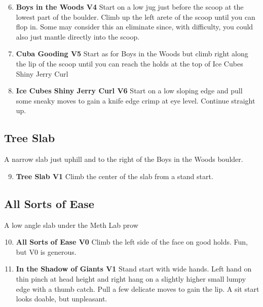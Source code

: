 \begin{enumerate}[]
	\setcounter{enumi}{5}
	\item\label{rt:Boys in the Woods} \colorbox{RoyalBlue!20}{\textbf{Boys in the Woods V4    } }
	\newline Start on a low jug just before the scoop at the lowest part of the boulder. Climb up the left arete of the scoop until you can flop in. Some may consider this an eliminate since, with difficulty, you could also just mantle directly into the scoop.\
	\setcounter{enumi}{6}
	\item\label{rt:Cuba Gooding} \colorbox{RoyalBlue!20}{\textbf{Cuba Gooding V5  } }
	\newline Start as for Boys in the Woods but climb right along the lip of the scoop until you can reach the holds at the top of Ice Cubes Shiny Jerry Curl\
	\setcounter{enumi}{7}
	\item\label{rt:Ice Cubes Shiny Jerry Curl} \colorbox{RoyalBlue!20}{\textbf{Ice Cubes Shiny Jerry Curl V6  } }
	\newline Start on a low sloping edge and pull some sneaky moves to gain a knife edge crimp at eye level. Continue straight up.\
\end{enumerate}
\subsection*{Tree Slab}\label{bf:Tree Slab}
A narrow slab just uphill and to the right of the Boys in the Woods boulder.

\begin{enumerate}[]
	\setcounter{enumi}{8}
	\item\label{rt:Tree Slab} \colorbox{green!20}{\textbf{Tree Slab V1    } }
	\newline Climb the center of the slab from a stand start.\
\end{enumerate}
\subsection*{All Sorts of Ease}\label{bf:All Sorts of Ease}
A low angle slab under the Meth Lab prow

\begin{enumerate}[]
	\setcounter{enumi}{9}
	\item\label{rt:All Sorts of Ease} \colorbox{green!20}{\textbf{All Sorts of Ease V0    } }
	\newline Climb the left side of the face on good holds. Fun, but V0 is generous.\
	\setcounter{enumi}{10}
	\item\label{rt:In the Shadow of Giants} \colorbox{green!20}{\textbf{In the Shadow of Giants V1   } }
	\newline Stand start with wide hands. Left hand on thin pinch at head height and right hang on a slightly higher small lumpy edge with a thumb catch. Pull a few delicate moves to gain the lip. A sit start looks doable, but unpleasant.\
\end{enumerate}
\halfPic{}{./maps/topos/tonsil_c.png}{Tonsil}
